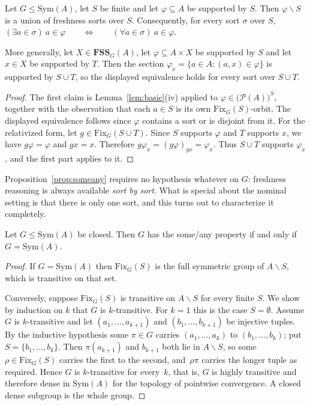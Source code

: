 \documentclass{lmcs}
\newcommand{\Sym}{\mathrm{Sym}}
\newcommand{\Fix}{\mathrm{Fix}}
\newcommand{\FSS}{\mathbf{FSS}}
\begin{document}
\begin{prop}\label{prop:someany}
Let $G\leq\Sym(A)$, let $S$ be finite and let $\varphi\subseteq A$ be
supported by $S$. Then $\varphi\smallsetminus S$ is a union of
freshness sorts over $S$. Consequently, for every sort $\sigma$ over
$S$, \quad $ (\exists a\in\sigma)\ a\in\varphi
   \qquad\Longleftrightarrow\qquad
   (\forall a\in\sigma)\ a\in\varphi$.

More generally, let $X\in\FSS_G(A)$, let $\varphi\subseteq A\times X$ be
supported by $S$ and let $x\in X$ be supported by $T$. Then the section
$\varphi_x=\{a\in A:(a,x)\in\varphi\}$ is supported by $S\cup T$, so the
displayed equivalence holds for every sort over $S\cup T$.
\end{prop}

\begin{proof}
The first claim is Lemma~\ref{lem:basic}(iv) applied to
$\varphi\in\bigl(\mathcal P(A)\bigr)^{S}$, together with the observation
that each $a\in S$ is its own $\Fix_G(S)$-orbit. The displayed
equivalence follows since $\varphi$ contains a sort or is disjoint from
it. For the relativized form, let $g\in\Fix_G(S\cup T)$. Since $S$
supports $\varphi$ and $T$ supports $x$, we have $g\varphi=\varphi$ and
$gx=x$. Therefore $g\varphi_x=(g\varphi)_{gx}=\varphi_x$. Thus
$S\cup T$ supports $\varphi_x$, and the first part applies to it.
\end{proof}

Proposition~\ref{prop:someany} requires no hypothesis whatever on $G$:
freshness reasoning is always available \emph{sort by sort}. What is
special about the nominal setting is that there is only one sort, and
this turns out to characterize it completely.

\begin{thm}
\label{thm:someanychar}
Let $G\leq\Sym(A)$ be closed. Then $G$ has the some/any property if
and only if $G=\Sym(A)$.
\end{thm}

\begin{proof}
If $G=\Sym(A)$ then $\Fix_G(S)$ is the full symmetric group of
$A\smallsetminus S$, which is transitive on that set.

Conversely, suppose $\Fix_G(S)$ is transitive on $A\smallsetminus S$ for
every finite $S$. We show by induction on $k$ that $G$ is
$k$-transitive. For $k=1$ this is the case $S=\emptyset$. Assume $G$
is $k$-transitive and let $(a_1,\dots,a_{k+1})$ and
$(b_1,\dots,b_{k+1})$ be injective tuples. By the inductive hypothesis
some $\pi\in G$ carries $(a_1,\dots,a_k)$ to $(b_1,\dots,b_k)$; put
$S=\{b_1,\dots,b_k\}$. Then $\pi(a_{k+1})$ and $b_{k+1}$ both lie in
$A\smallsetminus S$, so some $\rho\in\Fix_G(S)$ carries the first to the
second, and~$\rho\pi$ carries the longer tuple as required. Hence $G$
is $k$-transitive for every~$k$, that is, $G$ is highly transitive and
therefore dense in $\Sym(A)$ for the topology of pointwise convergence.
A closed dense subgroup is the whole group.
\end{proof}
\end{document}
